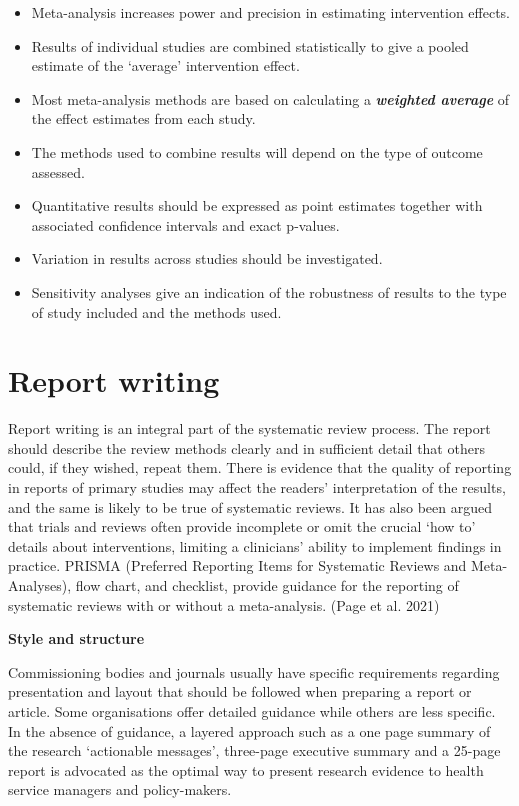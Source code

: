 \documentclass[
  11pt,
  a4paper,
  DIV=11,
  numbers=noendperiod]{scrreprt}
\begin{document}
\begin{itemize}
  \begin{itemize}
  \item
    Meta-analysis increases power and precision in estimating
    intervention effects.
  \item
    Results of individual studies are combined statistically to give a
    pooled estimate of the `average' intervention effect.
  \item
    Most meta-analysis methods are based on calculating a
    \textbf{\emph{weighted average}} of the effect estimates from each
    study.
  \item
    The methods used to combine results will depend on the type of
    outcome assessed.
  \item
    Quantitative results should be expressed as point estimates together
    with associated confidence intervals and exact p-values.
  \item
    Variation in results across studies should be investigated.
  \item
    Sensitivity analyses give an indication of the robustness of results
    to the type of study included and the methods used.
  \end{itemize}
\end{itemize}

\section{Report writing}\label{report-writing}

Report writing is an integral part of the systematic review process. The
report should describe the review methods clearly and in sufficient
detail that others could, if they wished, repeat them. There is evidence
that the quality of reporting in reports of primary studies may affect
the readers' interpretation of the results, and the same is likely to be
true of systematic reviews. It has also been argued that trials and
reviews often provide incomplete or omit the crucial `how to' details
about interventions, limiting a clinicians' ability to implement
findings in practice. PRISMA (Preferred Reporting Items for Systematic
Reviews and Meta- Analyses), flow chart, and checklist, provide guidance
for the reporting of systematic reviews with or without a meta-analysis.
(Page et al. 2021)

\textbf{Style and structure}

Commissioning bodies and journals usually have specific requirements
regarding presentation and layout that should be followed when preparing
a report or article. Some organisations offer detailed guidance while
others are less specific. In the absence of guidance, a layered approach
such as a one page summary of the research `actionable messages',
three-page executive summary and a 25-page report is advocated as the
optimal way to present research evidence to health service managers and
policy-makers.
\end{document}
